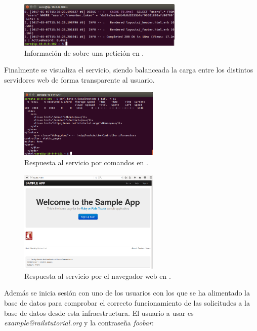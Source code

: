 \begin{figure}[H]
\centering
\includegraphics[width=0.7\textwidth]{images/figures/logs2-confd.png}
\caption{Información de  sobre una petición en .}
\end{figure}

Finalmente se visualiza el servicio, siendo balanceada la carga entre los distintos servidores web de forma transparente al usuario.

\begin{figure}[H]
\centering
\includegraphics[width=0.6\textwidth]{images/figures/curl-confd.png}
\caption{Respuesta al servicio por comandos en . \label{curl-confd}}
\end{figure}

\begin{figure}[H]
\centering
\includegraphics[width=0.6\textwidth]{images/figures/web-confd.png}
\caption{Respuesta al servicio por el navegador web en . \label{fig:web-confd}}
\end{figure}

Además se inicia sesión con uno de los usuarios con los que se ha alimentado la base de datos para comprobar el correcto funcionamiento de las solicitudes a la base de datos desde esta infraestructura. El usuario a usar es \textit{example@railstutorial.org} y la contraseña \textit{foobar}:


